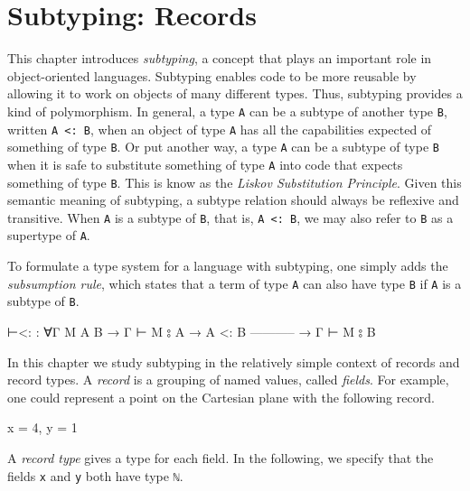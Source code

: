 \hypertarget{Subtyping}{%
\chapter{Subtyping: Records}\label{Subtyping}}

\begin{fence}
\begin{code}%
\>[0]\AgdaSpace{}%
\AgdaSpace{}%
\<%
\end{code}
\end{fence}

This chapter introduces \emph{subtyping}, a concept that plays an
important role in object-oriented languages. Subtyping enables code to
be more reusable by allowing it to work on objects of many different
types. Thus, subtyping provides a kind of polymorphism. In general, a
type \texttt{A} can be a subtype of another type \texttt{B}, written
\texttt{A\ \textless{}:\ B}, when an object of type \texttt{A} has all
the capabilities expected of something of type \texttt{B}. Or put
another way, a type \texttt{A} can be a subtype of type \texttt{B} when
it is safe to substitute something of type \texttt{A} into code that
expects something of type \texttt{B}. This is know as the \emph{Liskov
Substitution Principle}. Given this semantic meaning of subtyping, a
subtype relation should always be reflexive and transitive. When
\texttt{A} is a subtype of \texttt{B}, that is,
\texttt{A\ \textless{}:\ B}, we may also refer to \texttt{B} as a
supertype of \texttt{A}.

To formulate a type system for a language with subtyping, one simply
adds the \emph{subsumption rule}, which states that a term of type
\texttt{A} can also have type \texttt{B} if \texttt{A} is a subtype of
\texttt{B}.

\begin{myDisplay}
⊢<: : ∀{Γ M A B}
  → Γ ⊢ M ⦂ A
→ A <: B
    -----------
  → Γ ⊢ M ⦂ B
\end{myDisplay}

In this chapter we study subtyping in the relatively simple context of
records and record types. A \emph{record} is a grouping of named values,
called \emph{fields}. For example, one could represent a point on the
Cartesian plane with the following record.

\begin{myDisplay}
{ x = 4, y = 1 }
\end{myDisplay}

A \emph{record type} gives a type for each field. In the following, we
specify that the fields \texttt{x} and \texttt{y} both have type
\texttt{ℕ}.

